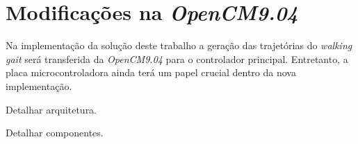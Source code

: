 \section{Modificações na \textit{OpenCM9.04}}

Na implementação da solução deste trabalho a geração das trajetórias do \textit{walking gait} será transferida da \textit{OpenCM9.04} para o controlador principal. Entretanto, a placa microcontroladora ainda terá um papel crucial dentro da nova implementação.


\begin{guide}
Detalhar arquitetura.
\end{guide}

\begin{guide}
Detalhar componentes.
\end{guide}


